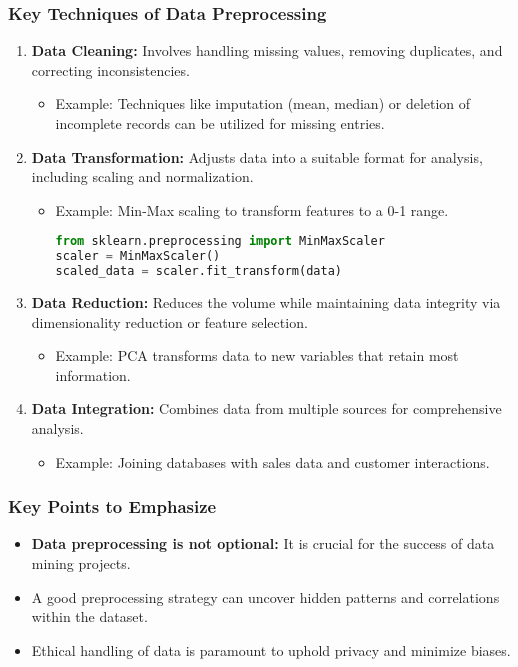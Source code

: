 \documentclass[aspectratio=169]{beamer}
\begin{document}
\begin{frame}[fragile]
    \frametitle{Key Techniques of Data Preprocessing}
    
    \begin{enumerate}
        \item \textbf{Data Cleaning:} Involves handling missing values, removing duplicates, and correcting inconsistencies.
            \begin{itemize}
                \item Example: Techniques like imputation (mean, median) or deletion of incomplete records can be utilized for missing entries.
            \end{itemize}
        
        \item \textbf{Data Transformation:} Adjusts data into a suitable format for analysis, including scaling and normalization.
            \begin{itemize}
                \item Example: Min-Max scaling to transform features to a 0-1 range.
                \begin{lstlisting}[language=python]
from sklearn.preprocessing import MinMaxScaler
scaler = MinMaxScaler()
scaled_data = scaler.fit_transform(data)
                \end{lstlisting}
            \end{itemize}

        \item \textbf{Data Reduction:} Reduces the volume while maintaining data integrity via dimensionality reduction or feature selection.
            \begin{itemize}
                \item Example: PCA transforms data to new variables that retain most information.
            \end{itemize}
        
        \item \textbf{Data Integration:} Combines data from multiple sources for comprehensive analysis.
            \begin{itemize}
                \item Example: Joining databases with sales data and customer interactions.
            \end{itemize}
    \end{enumerate}
\end{frame}

\begin{frame}[fragile]
    \frametitle{Key Points to Emphasize}
    
    \begin{itemize}
        \item \textbf{Data preprocessing is not optional:} It is crucial for the success of data mining projects.
        \item A good preprocessing strategy can uncover hidden patterns and correlations within the dataset.
        \item Ethical handling of data is paramount to uphold privacy and minimize biases.
    \end{itemize}
\end{frame}
\end{document}
